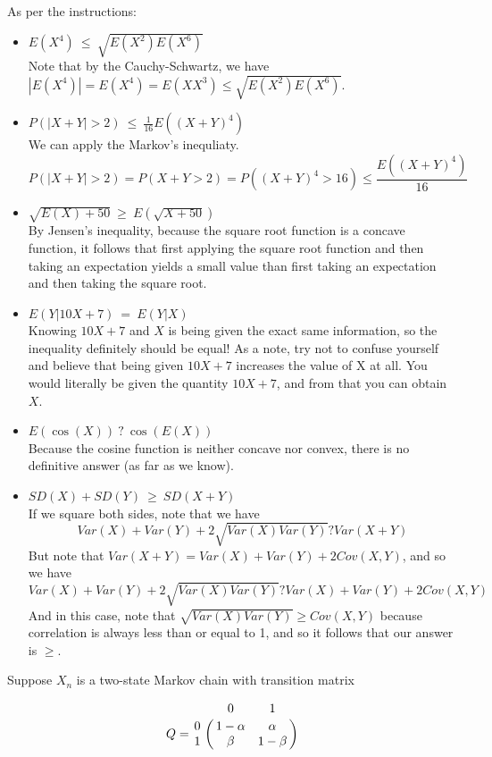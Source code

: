 \documentclass[11pt]{article}
\begin{document}
{\begin{solution}
As per the instructions:
\begin{itemize}
  \item $E(X^4) \ \leq \ \sqrt{E(X^2)E(X^6)}$\\
  Note that by the Cauchy-Schwartz, we have $|E(X^4)| = E(X^4) = E(XX^3) \leq \sqrt{E(X^2)E(X^6)}$.
  \item $P(|X+Y| > 2)  \ \leq \ \frac{1}{16}E((X+Y)^4)$\\
  We can apply the Markov's inequliaty.
  $$
  P(|X + Y| > 2) = P(X + Y > 2) = P((X+Y)^4 > 16) \leq \frac{E((X + Y)^4)}{16}
  $$
  \item $\sqrt{E(X)+50}  \ \geq \  E(\sqrt{X+50})$ \\
  By Jensen’s inequality, because the square root function is a concave function, it follows that first applying the square root function and then taking an expectation yields a small value than first taking an expectation and then taking the square root.
  \item $E(Y|10X + 7)  \ = \  E(Y|X)$\\
  Knowing $10X + 7$ and $X$ is being given the exact same information, so the inequality definitely should be equal! As a note, try not to confuse yourself and believe that being given $10X + 7$ increases the value of X at all. You would literally be given the quantity $10X + 7$, and from that you can obtain $X$.
  \item $E(\cos(X))  \ ? \  \cos(E(X))$ \\
  Because the cosine function is neither concave nor convex, there is no definitive answer (as far as we know).
  \item $SD(X) + SD(Y) \ \geq \ SD(X+Y)$\\
  If we square both sides, note that we have
  $$
  Var(X) + Var(Y ) + 2\sqrt{Var(X)Var(Y)} ? Var(X + Y )
  $$
  But note that $Var(X + Y ) = Var(X) + Var(Y ) + 2Cov(X, Y )$, and so we have
  $$
  Var(X) + Var(Y ) + 2\sqrt{Var(X)Var(Y)} ? Var(X) + Var(Y ) + 2Cov(X, Y )
  $$
    And in this case, note that $\sqrt{Var(X)Var(Y )} ≥ Cov(X, Y )$ because correlation is always less than or equal to 1, and so it follows that our answer is $\geq$.
\end{itemize}
\end{solution}

\begin{exercise}
Suppose $X_n$ is a two-state Markov chain with transition matrix

\[
Q = \bordermatrix{~ & 0 & 1 \cr
                  0 & 1-\alpha & \alpha \cr
                  1 & \beta & 1-\beta \cr}
\]


\end{exercise}}
\end{document}

